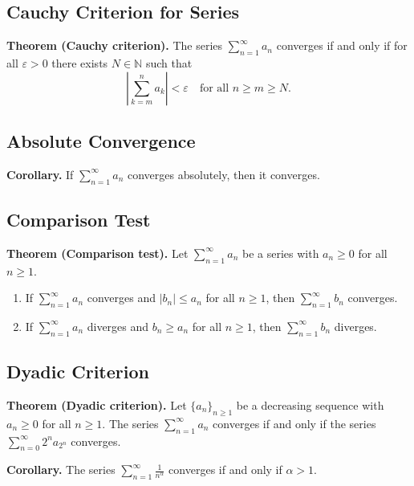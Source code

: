 \documentclass[12pt]{article}
\begin{document}
\subsection*{Cauchy Criterion for Series}
\textbf{Theorem (Cauchy criterion).} The series $\sum_{n=1}^{\infty} a_n$
converges if and only if for all $\varepsilon>0$ there exists $N\in\mathbb{N}$
such that
\[
\left|\sum_{k=m}^{n} a_k\right|<\varepsilon
\quad\text{for all } n\ge m\ge N.
\]

\subsection*{Absolute Convergence}
\textbf{Corollary.} If $\sum_{n=1}^{\infty} a_n$ converges absolutely, then it
converges.

\subsection*{Comparison Test}
\textbf{Theorem (Comparison test).} Let $\sum_{n=1}^{\infty} a_n$ be a series
with $a_n\ge 0$ for all $n\ge 1$.
\begin{enumerate}[label=\textbf{(\arabic*)}]
\item If $\sum_{n=1}^{\infty} a_n$ converges and $|b_n|\le a_n$ for all $n\ge 1$,
then $\sum_{n=1}^{\infty} b_n$ converges.
\item If $\sum_{n=1}^{\infty} a_n$ diverges and $b_n\ge a_n$ for all $n\ge 1$,
then $\sum_{n=1}^{\infty} b_n$ diverges.
\end{enumerate}

\subsection*{Dyadic Criterion}
\textbf{Theorem (Dyadic criterion).} Let $\{a_n\}_{n\ge 1}$ be a decreasing
sequence with $a_n\ge 0$ for all $n\ge 1$. The series
$\sum_{n=1}^{\infty} a_n$ converges if and only if the series
$\sum_{n=0}^{\infty} 2^n a_{2^n}$ converges.

\textbf{Corollary.} The series $\sum_{n=1}^{\infty} \frac{1}{n^{\alpha}}$
converges if and only if $\alpha>1$.
\end{document}
